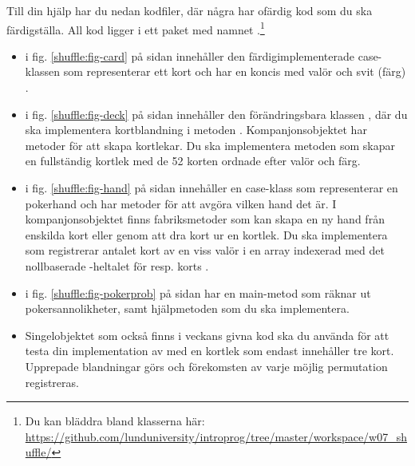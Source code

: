 Till din hjälp har du nedan kodfiler, där några har ofärdig kod som du ska färdigställa. All kod  ligger i ett paket med namnet .\footnote{Du kan bläddra bland klasserna här: \\
\href{https://github.com/lunduniversity/introprog/tree/master/workspace/w07_shuffle/}{\mbox{\fontsize{9}{11}\selectfont  https://github.com/lunduniversity/introprog/tree/master/workspace/w07\_shuffle/}}}

\begin{itemize}
\item {} i fig. \ref{shuffle:fig-card} på sidan \pageref{shuffle:fig-card} innehåller den färdigimplementerade case-klassen  som representerar ett kort och har en koncis  med valör  och svit (färg) .

\item {} i fig. \ref{shuffle:fig-deck} på sidan \pageref{shuffle:fig-deck} innehåller den förändringsbara klassen , där du ska implementera kortblandning i metoden . Kompanjonsobjektet har metoder för att skapa kortlekar. Du ska implementera metoden  som skapar en fullständig kortlek med de 52 korten ordnade efter valör och färg.

\item {} i fig. \ref{shuffle:fig-hand} på sidan \pageref{shuffle:fig-hand} innehåller en case-klass  som representerar en pokerhand och har metoder för att avgöra vilken hand det är. I kompanjonsobjektet finns fabriksmetoder som kan skapa en ny hand från enskilda kort eller genom att dra kort ur en kortlek. Du ska implementera  som registrerar antalet kort av en viss valör i en array indexerad med det nollbaserade -heltalet för resp. korts .

\item {} i fig. \ref{shuffle:fig-pokerprob} på sidan \pageref{shuffle:fig-pokerprob} har en main-metod som räknar ut pokersannolikheter, samt hjälpmetoden  som du ska implementera.

\item Singelobjektet  som också finns i veckans givna kod ska du använda för att testa din implementation av  med en kortlek som endast innehåller tre kort. Upprepade blandningar görs och förekomsten av varje möjlig permutation  registreras.

\end{itemize}

